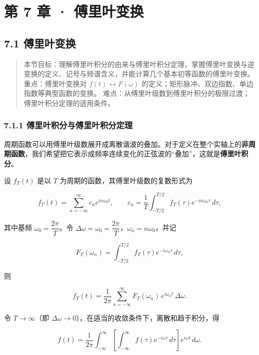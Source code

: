 \chapter{第 7 章 ·
傅里叶变换}\label{ux7b2c-7-ux7ae0-ux5085ux91ccux53f6ux53d8ux6362}

\section{7.1 傅里叶变换}\label{ux5085ux91ccux53f6ux53d8ux6362}

\begin{quote}
本节目标：理解傅里叶积分的由来与傅里叶积分定理，掌握傅里叶变换与逆变换的定义、记号与频谱含义，并能计算几个基本初等函数的傅里叶变换。
重点：傅里叶变换对 \(f(t)\leftrightarrow F(\omega)\)
的定义；矩形脉冲、双边指数、单边指数等典型函数的变换。
难点：从傅里叶级数到傅里叶积分的极限过渡；傅里叶积分定理的适用条件。
\end{quote}

\subsection{7.1.1
傅里叶积分与傅里叶积分定理}\label{ux5085ux91ccux53f6ux79efux5206ux4e0eux5085ux91ccux53f6ux79efux5206ux5b9aux7406}

周期函数可以用傅里叶级数展开成离散谐波的叠加。对于定义在整个实轴上的\textbf{非周期函数}，我们希望把它表示成频率连续变化的正弦波的``叠加''，这就是\textbf{傅里叶积分}。

设 \(f_T(t)\) 是以 \(T\) 为周期的函数，其傅里叶级数的复数形式为

\[
f_T(t)=\sum_{n=-\infty}^{\infty} c_n e^{in\omega_0 t},
\qquad
c_n=\frac{1}{T}\int_{-T/2}^{T/2} f_T(\tau)e^{-in\omega_0\tau}\,d\tau,
\]

其中基频 \(\omega_0=\dfrac{2\pi}{T}\)。令
\(\Delta\omega=\omega_0=\dfrac{2\pi}{T}\)，\(\omega_n=n\omega_0\)，并记

\[
F_T(\omega_n)=\int_{-T/2}^{T/2} f_T(\tau)e^{-i\omega_n\tau}\,d\tau,
\]

则

\[
f_T(t)=\frac{1}{2\pi}\sum_{n=-\infty}^{\infty} F_T(\omega_n)\,e^{i\omega_n t}\,\Delta\omega .
\]

令 \(T\to\infty\)（即
\(\Delta\omega\to 0\)），在适当的收敛条件下，离散和趋于积分，得

\[
f(t)=\frac{1}{2\pi}\int_{-\infty}^{\infty}\left[\int_{-\infty}^{\infty}f(\tau)e^{-i\omega\tau}\,d\tau\right]e^{i\omega t}\,d\omega .
\]

